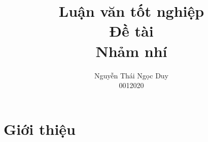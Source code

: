\documentclass[a4paper]{book} %
\title{Luận văn tốt nghiệp\\Đề tài\\Nhảm nhí}
\author{Nguyễn Thái Ngọc Duy\\0012020}
\begin{document}

\chapter{Giới thiệu}
\label{cha:intro}

































\end{document}
